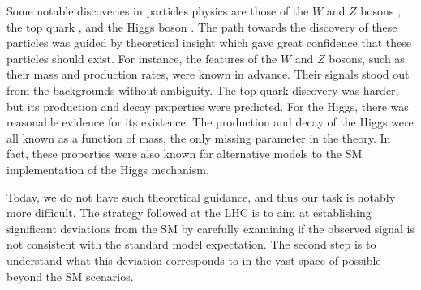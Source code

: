 Some notable discoveries in particles physics are those of the 
$W$ and $Z$ bosons \cite{Arnison:1984qu,Bagnaia:1983zx}, the top quark  
\cite{PhysRevLett.74.2626,Abachi:1995iq}, and the Higgs boson \cite{atlas_higgs, cms_higgs}.
The path towards the discovery of these particles was guided by 
theoretical insight which gave great confidence that these particles 
should exist. 
For instance, the features of the $W$ and $Z$ bosons, such as their mass 
and production rates, were known in advance. 
Their signals stood out from the backgrounds without ambiguity.
The top quark discovery was harder, but its production and decay 
properties were predicted.
For the Higgs, there was reasonable evidence for its existence.
The production and decay of the Higgs were all known as a function of 
mass, the only missing parameter in the theory. 
In fact, these properties were also known for alternative models 
to the SM implementation of the Higgs mechanism.

Today, we do not have such theoretical guidance, and thus our task 
is notably more difficult.
The strategy followed at the LHC is to aim at establishing 
significant deviations from the SM by carefully examining 
if the observed signal is not consistent with the standard model expectation.
The second step is to understand what this deviation corresponds to 
in the vast space of possible beyond the SM scenarios.


